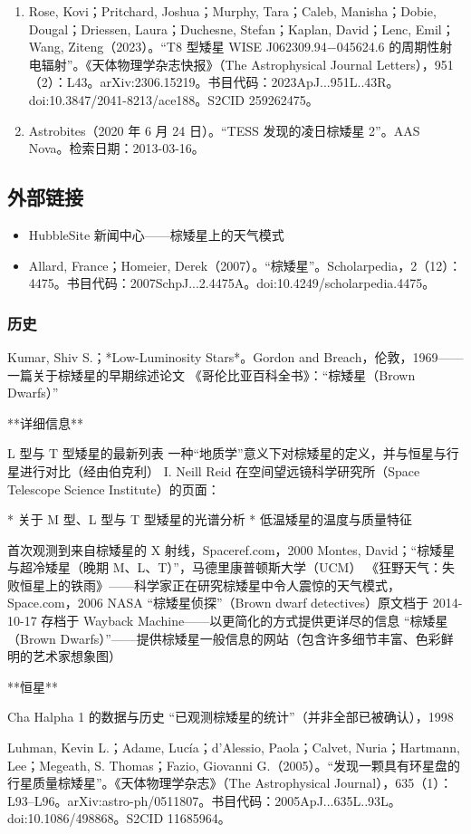 \begin{enumerate}
\item Rose, Kovi；Pritchard, Joshua；Murphy, Tara；Caleb, Manisha；Dobie, Dougal；Driessen, Laura；Duchesne, Stefan；Kaplan, David；Lenc, Emil；Wang, Ziteng（2023）。“T8 型矮星 WISE J062309.94−045624.6 的周期性射电辐射”。《天体物理学杂志快报》（The Astrophysical Journal Letters），951（2）：L43。arXiv:2306.15219。书目代码：2023ApJ...951L..43R。doi:10.3847/2041-8213/ace188。S2CID 259262475。
\item Astrobites（2020 年 6 月 24 日）。“TESS 发现的凌日棕矮星 2”。AAS Nova。检索日期：2013-03-16。
\end{enumerate}
\subsection{外部链接}
\begin{itemize}
\item HubbleSite 新闻中心——棕矮星上的天气模式
\item Allard, France；Homeier, Derek（2007）。“棕矮星”。Scholarpedia，2（12）：4475。书目代码：2007SchpJ...2.4475A。doi:10.4249/scholarpedia.4475。
\end{itemize}
\subsubsection{历史}
Kumar, Shiv S.；*Low-Luminosity Stars*。Gordon and Breach，伦敦，1969——一篇关于棕矮星的早期综述论文
《哥伦比亚百科全书》：“棕矮星（Brown Dwarfs）”

**详细信息**

L 型与 T 型矮星的最新列表
一种“地质学”意义下对棕矮星的定义，并与恒星与行星进行对比（经由伯克利）
I. Neill Reid 在空间望远镜科学研究所（Space Telescope Science Institute）的页面：

* 关于 M 型、L 型与 T 型矮星的光谱分析
* 低温矮星的温度与质量特征

首次观测到来自棕矮星的 X 射线，Spaceref.com，2000
Montes, David；“棕矮星与超冷矮星（晚期 M、L、T）”，马德里康普顿斯大学（UCM）
《狂野天气：失败恒星上的铁雨》——科学家正在研究棕矮星中令人震惊的天气模式，Space.com，2006
NASA “棕矮星侦探”（Brown dwarf detectives）原文档于 2014-10-17 存档于 Wayback Machine——以更简化的方式提供更详尽的信息
“棕矮星（Brown Dwarfs）”——提供棕矮星一般信息的网站（包含许多细节丰富、色彩鲜明的艺术家想象图）

**恒星**

Cha Halpha 1 的数据与历史
“已观测棕矮星的统计”（并非全部已被确认），1998

Luhman, Kevin L.；Adame, Lucía；d’Alessio, Paola；Calvet, Nuria；Hartmann, Lee；Megeath, S. Thomas；Fazio, Giovanni G.（2005）。“发现一颗具有环星盘的行星质量棕矮星”。《天体物理学杂志》（The Astrophysical Journal），635（1）：L93–L96。arXiv:astro-ph/0511807。书目代码：2005ApJ...635L..93L。doi:10.1086/498868。S2CID 11685964。

